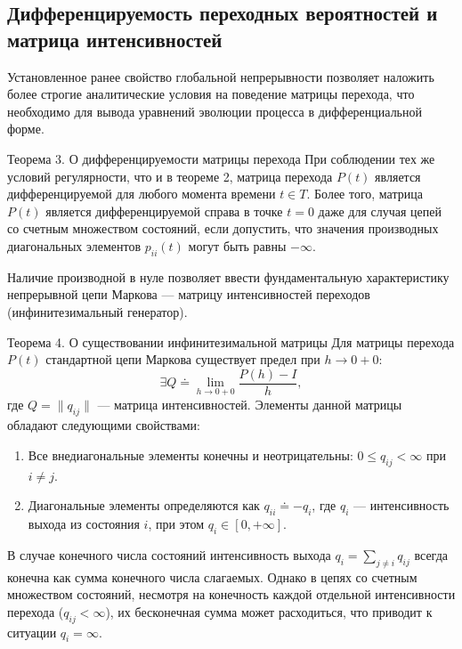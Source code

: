 \subsection{Дифференцируемость переходных вероятностей и матрица интенсивностей}

Установленное ранее свойство глобальной непрерывности позволяет наложить более строгие аналитические условия на поведение матрицы перехода, что необходимо для вывода уравнений эволюции процесса в дифференциальной форме.

\begin{theorem}{Теорема 3. О дифференцируемости матрицы перехода}
    При соблюдении тех же условий регулярности, что и в теореме 2, матрица перехода $P(t)$ является дифференцируемой для любого момента времени $t \in T$. Более того, матрица $P(t)$ является дифференцируемой справа в точке $t = 0$ даже для случая цепей со счетным множеством состояний, если допустить, что значения производных диагональных элементов $p_{ii}(t)$ могут быть равны $-\infty$.
\end{theorem}

Наличие производной в нуле позволяет ввести фундаментальную характеристику непрерывной цепи Маркова — матрицу интенсивностей переходов (инфинитезимальный генератор).

\begin{theorem}{Теорема 4. О существовании инфинитезимальной матрицы}
    Для матрицы перехода $P(t)$ стандартной цепи Маркова существует предел при $h \to 0+0$:
    \[
    \exists Q \doteq \lim_{h \to 0+0} \dfrac{P(h) - I}{h}, %
    \]
    где $Q = \|q_{ij}\|$ — матрица интенсивностей. Элементы данной матрицы обладают следующими свойствами:
    \begin{enumerate}
        \item Все внедиагональные элементы конечны и неотрицательны: $0 \leqslant q_{ij} < \infty$ при $i \neq j$.
        \item Диагональные элементы определяются как $q_{ii} \doteq -q_i$, где $q_i$ — интенсивность выхода из состояния $i$, при этом $q_i \in [0, +\infty]$.
    \end{enumerate}
\end{theorem}

\begin{note}
    В случае конечного числа состояний интенсивность выхода $q_i = \sum_{j \neq i} q_{ij}$ всегда конечна как сумма конечного числа слагаемых. Однако в цепях со счетным множеством состояний, несмотря на конечность каждой отдельной интенсивности перехода ($q_{ij} < \infty$), их бесконечная сумма может расходиться, что приводит к ситуации $q_i = \infty$.
\end{note}

